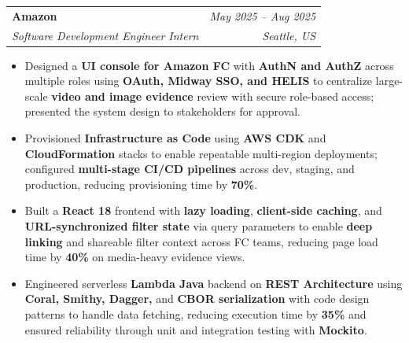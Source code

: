 \documentclass[10pt]{article}
\makeatletter
\newcommand{\resumeSubheading}[4]{
  \vspace{3pt}
  \begin{tabular*}{\textwidth}{@{}l@{\extracolsep{\fill}}r@{}}
    \textbf{#1} & \textit{#4} \\
    \textit{#3} & \textit{#2} \\
  \end{tabular*}\vspace{0pt}
}
\newcommand{\resumeItemListStart}{\begin{itemize}[leftmargin=12pt, itemsep=0.4pt, topsep=0.6pt, parsep=0pt]}
\newcommand{\resumeItemListEnd}{\end{itemize}\vspace{-1pt}}
\makeatother
\begin{document}
\resumeSubheading
{Amazon}{Seattle, US}
{Software Development Engineer Intern}{May 2025 -- Aug 2025}
\resumeItemListStart
  \item \footnotesize{Designed a \textbf{UI console for Amazon FC} with \textbf{AuthN and AuthZ} across multiple roles using \textbf{OAuth, Midway SSO, and HELIS} to centralize large-scale \textbf{video and image evidence} review with secure role-based access; presented the system design to stakeholders for approval.}
  \item \footnotesize{Provisioned \textbf{Infrastructure as Code} using \textbf{AWS CDK} and \textbf{CloudFormation} stacks to enable repeatable multi-region deployments; configured \textbf{multi-stage CI/CD pipelines} across dev, staging, and production, reducing provisioning time by \textbf{70\%}.}
  \item \footnotesize{Built a \textbf{React 18} frontend with \textbf{lazy loading}, \textbf{client-side caching}, and \textbf{URL-synchronized filter state} via query parameters to enable \textbf{deep linking} and shareable filter context across FC teams, reducing page load time by \textbf{40\%} on media-heavy evidence views.}
  \item \footnotesize{Engineered serverless \textbf{Lambda Java} backend on \textbf{REST Architecture} using \textbf{Coral, Smithy, Dagger,} and \textbf{CBOR serialization} with code design patterns to handle data fetching, reducing execution time by \textbf{35\%} and ensured reliability through unit and integration testing with \textbf{Mockito}.}
\resumeItemListEnd
\vspace{3pt}
\end{document}
